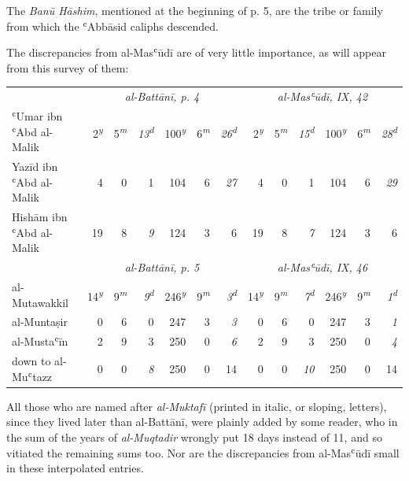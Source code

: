\documentclass[11pt]{article}
\begin{document}
\par The \emph{Banū Hāshim}, mentioned at the beginning of p. 5, are the tribe or family from which the ʿAbbāsid caliphs descended.\par
\par The discrepancies from al-Masʿūdī are of very little importance, as will appear from this survey of them:\par
\begin{center}\small\begin{tabular}{lrrrrrrrrrrrr}
 & \multicolumn{6}{c}{\emph{al-Battānī, p. 4}} & \multicolumn{6}{c}{\emph{al-Masʿūdī, IX, 42}} \\
ʿUmar ibn ʿAbd al-Malik & 2\textsuperscript{\itshape y} & 5\textsuperscript{\itshape m} & \emph{13}\textsuperscript{\itshape d} & 100\textsuperscript{\itshape y} & 6\textsuperscript{\itshape m} & \emph{26}\textsuperscript{\itshape d} & 2\textsuperscript{\itshape y} & 5\textsuperscript{\itshape m} & \emph{15}\textsuperscript{\itshape d} & 100\textsuperscript{\itshape y} & 6\textsuperscript{\itshape m} & \emph{28}\textsuperscript{\itshape d} \\
Yazīd ibn ʿAbd al-Malik & 4 & 0 & 1 & 104 & 6 & \emph{27} & 4 & 0 & 1 & 104 & 6 & \emph{29} \\
Hishām ibn ʿAbd al-Malik & 19 & 8 & \emph{9} & 124 & 3 & 6 & 19 & 8 & \emph{7} & 124 & 3 & 6 \\
\midrule
 & \multicolumn{6}{c}{\emph{al-Battānī, p. 5}} & \multicolumn{6}{c}{\emph{al-Masʿūdī, IX, 46}} \\
al-Mutawakkil & 14\textsuperscript{\itshape y} & 9\textsuperscript{\itshape m} & \emph{9}\textsuperscript{\itshape d} & 246\textsuperscript{\itshape y} & 9\textsuperscript{\itshape m} & \emph{3}\textsuperscript{\itshape d} & 14\textsuperscript{\itshape y} & 9\textsuperscript{\itshape m} & \emph{7}\textsuperscript{\itshape d} & 246\textsuperscript{\itshape y} & 9\textsuperscript{\itshape m} & \emph{1}\textsuperscript{\itshape d} \\
al-Muntaṣir & 0 & 6 & 0 & 247 & 3 & \emph{3} & 0 & 6 & 0 & 247 & 3 & \emph{1} \\
al-Mustaʿīn & 2 & 9 & 3 & 250 & 0 & \emph{6} & 2 & 9 & 3 & 250 & 0 & \emph{4} \\
down to al-Muʿtazz & 0 & 0 & \emph{8} & 250 & 0 & 14 & 0 & 0 & \emph{10} & 250 & 0 & 14 \\
\end{tabular}\end{center}
\par All those who are named after \emph{al-Muktafī} (printed in italic, or sloping, letters), since they lived later than al-Battānī, were plainly added by some reader, who in the sum of the years of \emph{al-Muqtadir} wrongly put 18 days instead of 11, and so vitiated the remaining sums too. Nor are the discrepancies from al-Masʿūdī small in these interpolated entries.\par
\end{document}
